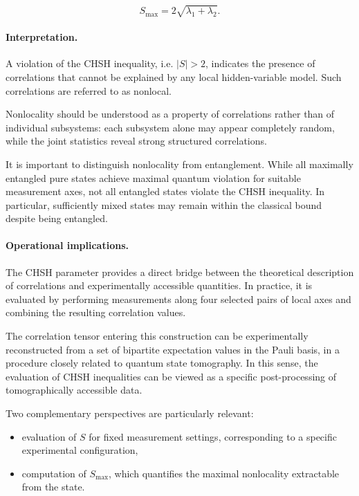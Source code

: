 \begin{equation}
S_{\max}
=
2\sqrt{\lambda_1+\lambda_2}.
\label{eq:chsh_smax_horodecki}
\end{equation}

\medskip

\paragraph{Interpretation.}

A violation of the CHSH inequality, i.e. \( |S| > 2 \), indicates the presence of correlations that cannot be explained by any local hidden-variable model. Such correlations are referred to as nonlocal.

\medskip

Nonlocality should be understood as a property of correlations rather than of individual subsystems: each subsystem alone may appear completely random, while the joint statistics reveal strong structured correlations.

\medskip

It is important to distinguish nonlocality from entanglement. While all maximally entangled pure states achieve maximal quantum violation for suitable measurement axes, not all entangled states violate the CHSH inequality. In particular, sufficiently mixed states may remain within the classical bound despite being entangled.

\medskip

\paragraph{Operational implications.}

The CHSH parameter provides a direct bridge between the theoretical description of correlations and experimentally accessible quantities. In practice, it is evaluated by performing measurements along four selected pairs of local axes and combining the resulting correlation values.

\medskip

The correlation tensor entering this construction can be experimentally reconstructed from a set of bipartite expectation values in the Pauli basis, in a procedure closely related to quantum state tomography.
In this sense, the evaluation of CHSH inequalities can be viewed as a specific post-processing of tomographically accessible data.

\medskip

Two complementary perspectives are particularly relevant:
\begin{itemize}
    \item evaluation of \( S \) for fixed measurement settings, corresponding to a specific experimental configuration,
    \item computation of \( S_{\max} \), which quantifies the maximal nonlocality extractable from the state.
\end{itemize}


